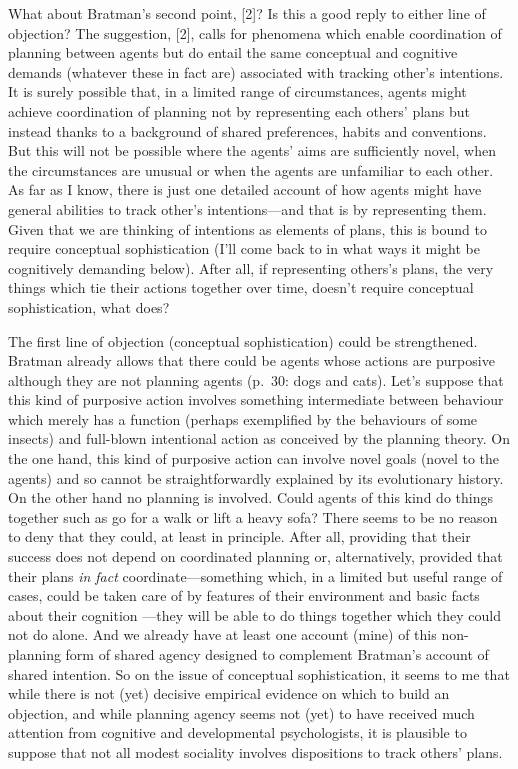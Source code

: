\documentclass[12pt,letterpaper]{extarticle}
\begin{document}
What about Bratman's second point,  [2]?
Is this a good reply to either line of objection?
The suggestion, [2], calls for phenomena which enable coordination of planning between agents but do entail the same conceptual and cognitive demands (whatever these in fact are) associated with  tracking other's intentions.
It is surely possible that, in a limited range of circumstances, agents might achieve coordination of planning not by representing each others' plans but instead thanks to a background of shared preferences, habits and conventions.
But this will not be possible where the agents' aims are sufficiently novel, when the circumstances are unusual or when the agents are unfamiliar to each other.
As far as I know, there is just one detailed account of how agents might have general abilities to track other's intentions---and that is by representing them.
Given that we are thinking of intentions as elements of plans, this is bound to require conceptual sophistication (I'll come back to in what ways it might be cognitively demanding below).
After all, if representing others's plans, the very things which tie their actions together over time, doesn't require conceptual sophistication, what does?

The first line of objection (conceptual sophistication) could be strengthened.
Bratman already allows that there could be agents whose actions are purposive although they are not planning agents (p.\ 30: dogs and cats).
Let's suppose that this kind of purposive action involves something intermediate between behaviour which merely has a function (perhaps exemplified by the behaviours of some insects) and full-blown intentional action as conceived by the planning theory.
On the one hand, this kind of purposive action can involve novel goals (novel to the agents) and so cannot be straightforwardly explained by its evolutionary history.
On the other hand no planning is involved.
Could agents of this kind do things together such as go for a walk or lift a heavy sofa?
There seems to be no reason to deny that they could, at least in principle.
After all, providing that their success does not depend on coordinated planning or, alternatively, provided that their plans \emph{in fact} coordinate---something which, in a limited but useful range of cases, could be taken care of by features of their environment and basic facts about their cognition \citep{richardson_judging_2007}---they will be able to do things together which they could not do alone.
And we already have at least one account (mine) of this non-planning form of shared agency designed to complement Bratman's account of shared intention.
So on the issue of conceptual sophistication, it seems to me that while there is not (yet) decisive empirical evidence on which to build an objection, and while planning agency seems not (yet) to have received much attention from cognitive and developmental psychologists, it is plausible to suppose that not all modest sociality involves dispositions to track others' plans.
\end{document}
